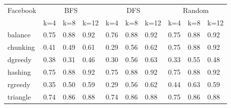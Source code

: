 \documentclass[12pt]{article}
\begin{document}
\begin{tabular}{llllllllll}
\toprule
    Facebook & \multicolumn{3}{c}{BFS} & \multicolumn{3}{c}{DFS} & \multicolumn{3}{c}{Random}\\

    & k=4 & k=8 & k=12
    & k=4 & k=8 & k=12
     & k=4 & k=8 & k=12  \\
    \midrule
    balance &  0.75 & 0.88 	& 0.92 	& 0.76 	 &0.88 	& 0.92 	 &0.75 	& 0.88 	& 0.92       \\
chunking&	  0.41 	& 0.49 &	 0.61 &	 0.29 &	 0.56 &	 0.62 &	 0.75 &	 0.88 &	 0.92 \\
dgreedy&	  0.38 	& 0.31 &	 0.46 &	 0.30 &	 0.56 &	 0.63 &	 0.33 &	 0.55 &	 0.48  \\
hashing&	    0.75 	& 0.88 &	 0.92 &	 0.75 &	 0.88 &	 0.92 &	 0.75 &	 0.88 &	 0.92 \\
rgreedy&	    0.35 	& 0.50 &	 0.59 &	 0.29 &	 0.56 &	 0.62 &	 0.44 &	 0.63 &	 0.59 \\
triangle&	    0.74 	& 0.86 &	 0.88 &	 0.74 &	 0.86 &	 0.88 &	 0.75 &	 0.86 &	 0.88  \\
    \bottomrule
\end{tabular}
\end{document}
